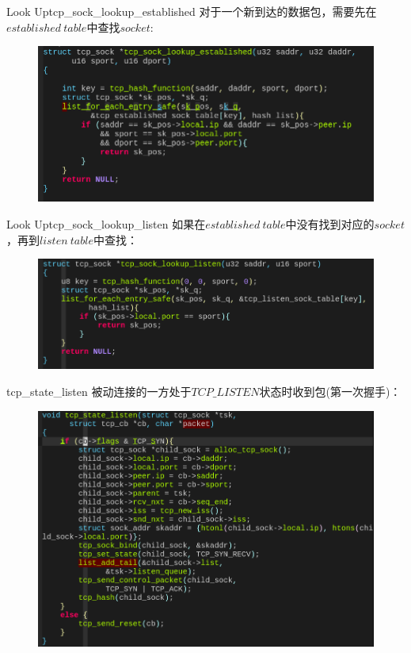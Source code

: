 \documentclass{beamer}
\begin{document}
\begin{frame}{Look Up}{tcp\_sock\_lookup\_established}
  对于一个新到达的数据包，需要先在$established\ table$中查找$socket$:
  \begin{figure}[H]
	\centering
	\includegraphics[scale = 0.35]{./fig/est.png}
  \end{figure}
\end{frame}

\begin{frame}{Look Up}{tcp\_sock\_lookup\_listen}
  如果在$established\ table$中没有找到对应的$socket$，再到$listen\ table$中查找：
  \begin{figure}[H]
	\centering
	\includegraphics[scale = 0.35]{./fig/looklis.png}
  \end{figure}
\end{frame}

\begin{frame}{tcp\_state\_listen}
  被动连接的一方处于$TCP\_LISTEN$状态时收到包(第一次握手)：
  \begin{figure}[H]
	\centering
	\includegraphics[scale = 0.32]{./fig/state_lis.png}
  \end{figure}
\end{frame}
\end{document}
